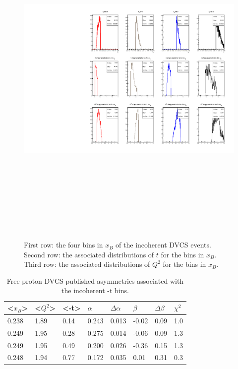 \begin{figure}[h!]
   \centering
   \includegraphics[height=17.0cm]{4D-incoh-bin/4D-xB_InCoh_bins.pdf}
   \caption{ First row: the four bins in $x_B$ of the incoherent DVCS events.  
   Second row: the associated distributions of $t$ for the bins in $x_B$.    
   Third row: the associated distributions of $Q^2$ for the bins in $x_B$.}
\label{fig:incoh_xB-bins-freep}
\end{figure}



\begin {table}[!h]
\begin{center}
\begin{tabular}{|l|l|l|l|l|l|l|l|}
\hline
<$x_{B}$> & <$Q^2$> & <-t> & $\alpha$ & $\Delta \alpha$ &  $\beta$ & $\Delta 
   \beta$ & $\chi^{2}$\\
\hline
0.238  & 1.89 & 0.14 & 0.243 & 0.013 & -0.02 & 0.09 & 1.0\\
\hline
0.249  & 1.95 & 0.28 & 0.275 & 0.014 & -0.06 & 0.09 & 1.3\\
\hline
0.249  & 1.95 & 0.49 & 0.200 & 0.026 & -0.36 & 0.15 & 1.3\\
\hline
0.248  & 1.94 & 0.77 & 0.172 & 0.035 & 0.01 &  0.31 & 0.3\\
\hline
\end{tabular}
   \caption{Free proton DVCS published asymmetries associated with the 
   incoherent -t bins.}
\label{Table:freeproton-t_bins}
\end{center}
\end{table}



